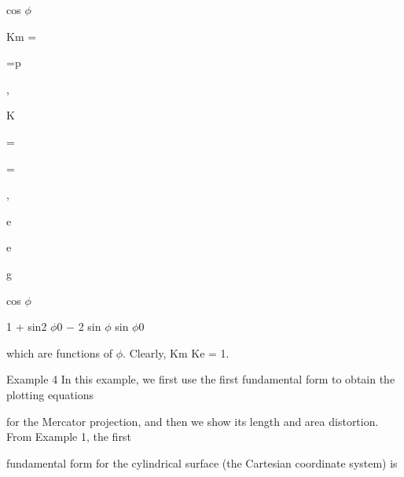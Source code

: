 \documentclass[a4paper,portrait,12pt]{article}
\begin{document}
\begin{flushleft}
cos $\phi$
\end{flushleft}


\begin{flushleft}
Km =
\end{flushleft}


\begin{flushleft}
=p
\end{flushleft}


,


\begin{flushleft}
K
\end{flushleft}


=


=


,


\begin{flushleft}
e
\end{flushleft}


\begin{flushleft}
e
\end{flushleft}


\begin{flushleft}
g
\end{flushleft}


\begin{flushleft}
cos $\phi$
\end{flushleft}


\begin{flushleft}
1 + sin2 $\phi$0 $-$ 2 sin $\phi$ sin $\phi$0
\end{flushleft}


\begin{flushleft}
which are functions of $\phi$. Clearly, Km Ke = 1.
\end{flushleft}


\begin{flushleft}
Example 4 In this example, we first use the first fundamental form to obtain the plotting equations
\end{flushleft}


\begin{flushleft}
for the Mercator projection, and then we show its length and area distortion. From Example 1, the first
\end{flushleft}


\begin{flushleft}
fundamental form for the cylindrical surface (the Cartesian coordinate system) is
\end{flushleft}
\end{document}
